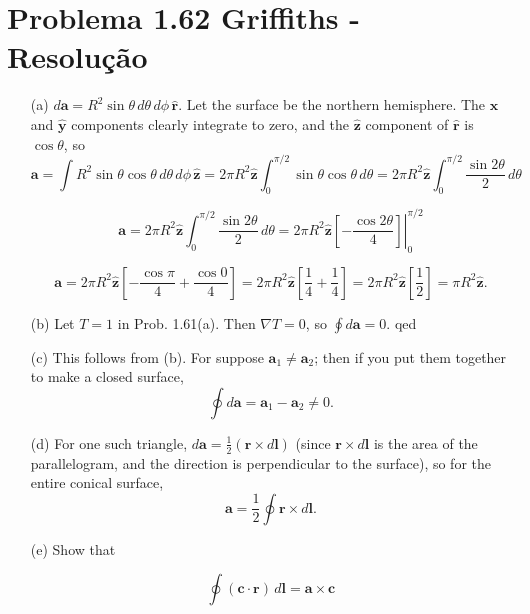 \documentclass[a4paper,12pt]{article}
\begin{document}
\section*{Problema 1.62 Griffiths - Resolu\c{c}\~ao}

\begin{itemize}
    \item[(a)] $d\mathbf{a} = R^2 \sin \theta \, d\theta \, d\phi \, \hat{\mathbf{r}}.$ Let the surface be the northern hemisphere. The $\hat{\mathbf{x}}$ and $\hat{\mathbf{y}}$ components clearly integrate to zero, and the $\hat{\mathbf{z}}$ component of $\hat{\mathbf{r}}$ is $\cos \theta$, so  
    \[
    \mathbf{a} = \int R^2 \sin \theta \cos \theta \, d\theta \, d\phi \, \hat{\mathbf{z}}
    = 2\pi R^2 \hat{\mathbf{z}} \int_0^{\pi/2} \sin \theta \cos \theta \, d\theta 
    = 2\pi R^2 \hat{\mathbf{z}} \int_0^{\pi/2} \frac{\sin 2\theta}{2} \, d\theta
    \]

    \[
    \mathbf{a} = 2\pi R^2 \hat{\mathbf{z}} \int_0^{\pi/2} \frac{\sin 2\theta}{2} \, d\theta 
    = 2\pi R^2 \hat{\mathbf{z}} \left.\left[-\frac{\cos 2\theta}{4}\right]\right|_0^{\pi/2}
    \]

    \[
    \mathbf{a} = 2\pi R^2 \hat{\mathbf{z}} \left[-\frac{ \cos \pi}{4} + \frac{\cos 0}{4}\right]
    = 2\pi R^2 \hat{\mathbf{z}} \left[\frac{1}{4} + \frac{1}{4}\right]
    = 2\pi R^2 \hat{\mathbf{z}} \left[\frac{1}{2}\right]
    = \pi R^2 \hat{\mathbf{z}}.
    \]


    \item[(b)] Let $T = 1$ in Prob. 1.61(a). Then $\nabla T = 0$, so $\oint d\mathbf{a} = 0.$ \hspace{1cm} qed

    \item[(c)] This follows from (b). For suppose $\mathbf{a}_1 \neq \mathbf{a}_2$; then if you put them together to make a closed surface, 
    \[
    \oint d\mathbf{a} = \mathbf{a}_1 - \mathbf{a}_2 \neq 0.
    \]

    \item[(d)] For one such triangle, $d\mathbf{a} = \frac{1}{2} (\mathbf{r} \times d\mathbf{l})$ (since $\mathbf{r} \times d\mathbf{l}$ is the area of the parallelogram, and the direction is perpendicular to the surface), so for the entire conical surface, 
    \[
    \mathbf{a} = \frac{1}{2} \oint \mathbf{r} \times d\mathbf{l}.
    \]

    \item[(e)] Show that 

    \[\oint (\mathbf{c} \cdot \mathbf{r}) \, d\mathbf{l} = \mathbf{a} \times \mathbf{c}\]
    

\end{itemize}
\end{document}
